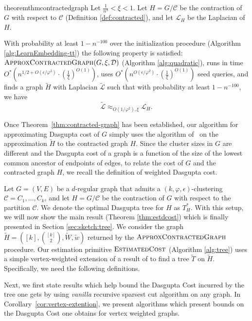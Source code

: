 \documentclass[letterpaper,11pt]{article}
\newcommand{\runningtimeiv}{ O^*\left(n^{1/2+O(\e/\varphi^2)}\cdot \left(\frac{1}{\xi}\right)^{O(1)}\right)}
\newcommand{\cC}{\mathcal{C}}
\newcommand{\cD}{\mathcal{D}}
\newcommand{\cL}{\mathcal{L}}
\theoremstyle{plain}
\theoremstyle{definition}
\theoremstyle{remark}
\newcommand{\e}{\epsilon}
\newcommand{\wt}[1]{\widetilde{#1}}
\begin{document}
\begin{restatable}{theorem}{thmcontractedgraph}\label{thm:contracted-graph}
Let $\frac{1}{n^3}<\xi<1$.  Let $H=G/\cC$  be the contraction of $G$ with respect to $\cC$ (Definition \ref{def:contracted}), and let $\mathcal{L}_H$ be the Laplacian of $H$. 

With probability at least $1 - n^{-100}$ over the initialization procedure (Algorithm \ref{alg:LearnEmbedding-tt}) the following property is satisfied: 
	$\textsc{ApproxContractedGraph}(G, \xi, \cD)$ (Algorithm \ref{alg:quadratic}), runs in time 
	$\runningtimeiv$, uses $O^*\left(n^{O(\e/\varphi^2)}\cdot \left(\frac{1}{\xi}\right)^{O(1)}\right)$ seed queries, 
and finds a graph $\wt{H}$ with Laplacian $\wt{\mathcal{L}}$ such that with probability
	at least $1 - n^{-100}$, we have
$$ \wt{\cL}\approx_{O(1/\varphi^2), \xi} \cL_H. $$ 
\end{restatable}

Once Theorem~\ref{thm:contracted-graph} has been established, our algorithm for approximating Dasgupta cost of $G$ simply uses the algorithm of~\cite{charikar2017approximate} on the approximation $\wt{H}$ to the contracted graph $H$. Since the cluster sizes in $G$ are different and the Dasgupta cost of a graph is a function of the size of the lowest common ancestor of endpoints of edges, to relate the cost of $G$ and the contracted graph $H$, we recall the definition of weighted Dasgupta cost.




Let $G=(V,E)$ be a $d$-regular graph that admits a $(k,\varphi,\epsilon)$-clustering $\cC = C_1, \ldots , C_k$, and  let $H = G/\cC$ be the contraction of $G$ with respect to the partition $\cC $. We denote
the optimal Dasgupta tree for $H$ as $T^*_H$. With this setup,
we will now show the main result (Theorem \ref{thm:estdcost})
which is finally presented in Section \ref{sec:sketch:tree}. 
We consider the graph $\wt{H} = \left([k], {[k] \choose 2}, \widetilde{W}, \widetilde{w}\right)$ returned by the $\textsc{ApproxContractedGraph}$ procedure. 
Our estimation primitive $\textsc{EstimatedCost}$ (Algorithm \ref{alg:tree}) uses a simple vertex-weighted extension of a result of \cite{charikar2017approximate}
to find a 
tree $\wt{T}$ on $\wt{H}$. Specifically, we need the following definitions.

\wsparsestcut*
\wrsc*

Next, we first state results which help bound the Dasgupta Cost incurred by the tree one gets by using \emph{vanilla} recursive sparsest cut algorithm on any graph. In Corollary~\ref{cor:vertex-extention}, we present algorithms which present bounds on the Dasgupta Cost one obtains for vertex weighted graphs. 
\end{document}
